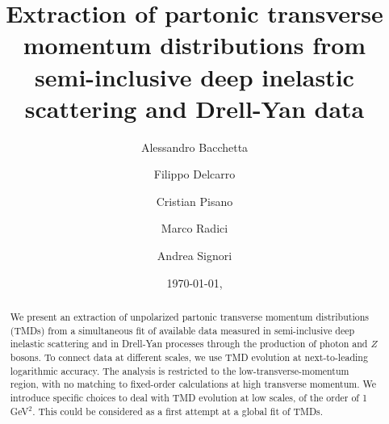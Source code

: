 \documentclass[aps,preprintnumbers,showpacs,nofootinbib,superscriptaddress,floatfix]{revtex4}
\begin{document}
\allowdisplaybreaks[2]


\title{
Extraction of partonic transverse momentum distributions 
from semi-inclusive deep
inelastic scattering and Drell-Yan data
}

\author{Alessandro Bacchetta}

\author{Filippo Delcarro}

\author{Cristian Pisano}

\author{Marco Radici}

\author{Andrea Signori}

\begin{abstract}
We present an extraction of unpolarized partonic transverse momentum
distributions (TMDs) 
from a simultaneous fit of available data measured in semi-inclusive deep inelastic scattering 
and in Drell-Yan processes through the production of photon and $Z$ bosons. 
To connect data at different scales, we use TMD evolution at next-to-leading logarithmic accuracy. The
analysis is restricted to the low-transverse-momentum region, with no matching
to fixed-order calculations at high transverse momentum. We introduce specific
choices to deal with TMD evolution at low scales, of the order of 1 GeV$^2$.
This could be considered as a first attempt at a global fit of TMDs.
\end{abstract}


\date{\today, \currenttime}
\end{document}
